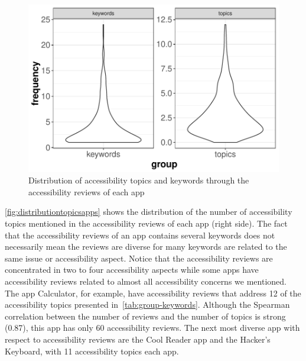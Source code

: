  \begin{figure}[!htb]
 \centering
\includegraphics[scale=0.8]{imagens/distribution-topics-keywords.pdf}
\caption{Distribution of accessibility topics and keywords through the accessibility reviews of each app}
\label{fig:distributiontopicsapps}
\end{figure}


\autoref{fig:distributiontopicsapps} shows the distribution of the number of accessibility topics mentioned in the accessibility reviews of each app (right side). The fact that the accessibility reviews of an app contains several keywords does not necessarily mean the reviews are diverse for many keywords are related to the same issue or accessibility aspect. Notice that the accessibility reviews are concentrated in two to four accessibility aspects while some apps have accessibility reviews related to almost all accessibility concerns we mentioned. The app Calculator,
for example, have accessibility reviews that address 12 of the accessibility topics presented in~\autoref{tab:group-keywords}. Although the Spearman correlation between the number of reviews and the number of topics is strong (0.87), this app has only 60 accessibility reviews. The next most diverse app with respect to accessibility reviews are the Cool Reader app and the Hacker's Keyboard, %
with 11 accessibility topics each app.




